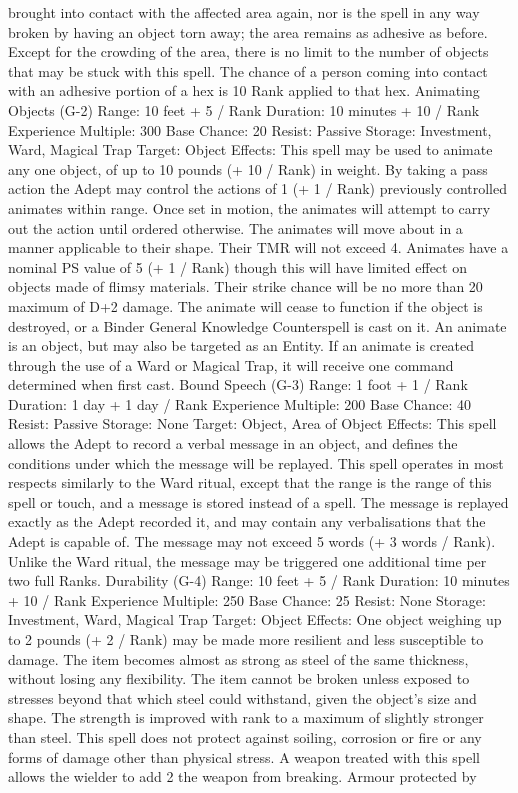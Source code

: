 \documentclass[a4paper]{article}
\begin{document}
\begin{multicols}{3}
brought into contact with the affected area again,
nor is the spell in any way broken by having an
object torn away; the area remains as adhesive as
before. Except for the crowding of the area, there is
no limit to the number of objects that may be stuck
with this spell. The chance of a person coming into
contact with an adhesive portion of a hex is 10%
Rank applied to that hex.
Animating Objects (G-2)
Range: 10 feet + 5 / Rank
Duration: 10 minutes + 10 / Rank
Experience Multiple: 300
Base Chance: 20%
Resist: Passive
Storage: Investment, Ward, Magical Trap
Target: Object
Effects: This spell may be used to animate any one
object, of up to 10 pounds (+ 10 / Rank) in weight.
By taking a pass action the Adept may control the
actions of 1 (+ 1 / Rank) previously controlled
animates within range. Once set in motion, the
animates will attempt to carry out the action until
ordered otherwise. The animates will move about
in a manner applicable to their shape. Their TMR
will not exceed 4.
Animates have a nominal PS value of 5 (+ 1 /
Rank) though this will have limited effect on objects made of flimsy materials. Their strike chance
will be no more than 20%
maximum of D+2 damage. The animate will cease
to function if the object is destroyed, or a Binder
General Knowledge Counterspell is cast on it. An
animate is an object, but may also be targeted as an
Entity. If an animate is created through the use of a
Ward or Magical Trap, it will receive one command determined when first cast.
Bound Speech (G-3)
Range: 1 foot + 1 / Rank
Duration: 1 day + 1 day / Rank
Experience Multiple: 200
Base Chance: 40%
Resist: Passive
Storage: None
Target: Object, Area of Object
Effects: This spell allows the Adept to record a
verbal message in an object, and defines the conditions under which the message will be replayed.
This spell operates in most respects similarly to the
Ward ritual, except that the range is the range of
this spell or touch, and a message is stored instead
of a spell. The message is replayed exactly as the
Adept recorded it, and may contain any verbalisations that the Adept is capable of. The message
may not exceed 5 words (+ 3 words / Rank).
Unlike the Ward ritual, the message may be triggered one additional time per two full Ranks.
Durability (G-4)
Range: 10 feet + 5 / Rank
Duration: 10 minutes + 10 / Rank
Experience Multiple: 250
Base Chance: 25%
Resist: None
Storage: Investment, Ward, Magical Trap
Target: Object
Effects: One object weighing up to 2 pounds (+ 2 /
Rank) may be made more resilient and less susceptible to damage. The item becomes almost as
strong as steel of the same thickness, without losing any flexibility. The item cannot be broken
unless exposed to stresses beyond that which steel
could withstand, given the object’s size and shape.
The strength is improved with rank to a maximum
of slightly stronger than steel.
This spell does not protect against soiling, corrosion or fire or any forms of damage other than
physical stress.
A weapon treated with this spell allows the wielder
to add 2%
the weapon from breaking. Armour protected by


\end{multicols}
\end{document}
